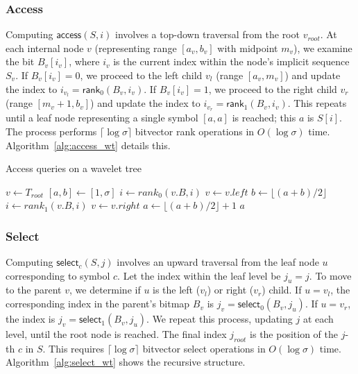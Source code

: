 \subsubsection{Access}
Computing $\textsf{access}(S, i)$ involves a top-down traversal from the root $v_{root}$. At each internal node $v$ (representing range $[a_v, b_v]$ with midpoint $m_v$), we examine the bit $B_v[i_v]$, where $i_v$ is the current index within the node's implicit sequence $S_v$. If $B_v[i_v] = 0$, we proceed to the left child $v_l$ (range $[a_v, m_v]$) and update the index to $i_{v_l} = \textsf{rank}_0(B_v, i_v)$. If $B_v[i_v] = 1$, we proceed to the right child $v_r$ (range $[m_v+1, b_v]$) and update the index to $i_{v_r} = \textsf{rank}_1(B_v, i_v)$. This repeats until a leaf node representing a single symbol $[a, a]$ is reached; this $a$ is $S[i]$. The process performs $\lceil \log \sigma \rceil$ bitvector \textsf{rank} operations in $O(\log \sigma)$ time. Algorithm~\ref{alg:access_wt} details this.

\begin{algorithm}[h!]
    \caption{\textsf{Access} queries on a wavelet tree}\label{alg:access_wt}
    \small
    \begin{algorithmic}
         
        \State $v \gets T_{root}$ 
        \State $[a,b] \gets [1,\sigma]$
         
        \State $i \gets rank_0(v.B,i)$
        \State $v \gets v.left$ 
        \State $b \gets \lfloor (a+b)/2 \rfloor$
        \Else
        \State $i \gets rank_1(v.B,i)$
        \State $v \gets v.right$ 
        \State $a \gets \lfloor (a+b)/2 \rfloor +1$
        \EndIf
        \EndWhile
        \State \Return $a$
        \EndFunction
    \end{algorithmic}
\end{algorithm}

\subsubsection{Select}
Computing $\textsf{select}_c(S, j)$ involves an upward traversal from the leaf node $u$ corresponding to symbol $c$. Let the index within the leaf level be $j_u = j$. To move to the parent $v$, we determine if $u$ is the left ($v_l$) or right ($v_r$) child. If $u = v_l$, the corresponding index in the parent's bitmap $B_v$ is $j_v = \textsf{select}_0(B_v, j_u)$. If $u = v_r$, the index is $j_v = \textsf{select}_1(B_v, j_u)$. We repeat this process, updating $j$ at each level, until the root node is reached. The final index $j_{root}$ is the position of the $j$-th $c$ in $S$. This requires $\lceil \log \sigma \rceil$ bitvector \textsf{select} operations in $O(\log \sigma)$ time. Algorithm~\ref{alg:select_wt} shows the recursive structure.

